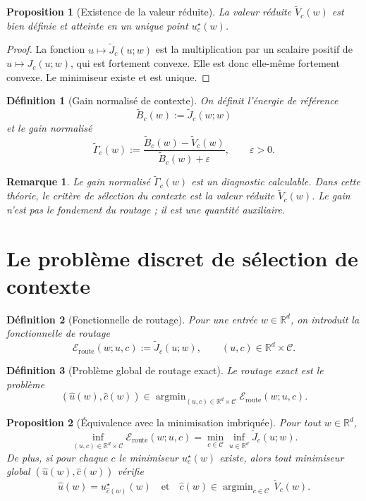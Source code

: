 \documentclass[11pt,a4paper]{article}
\newtheorem{definition}{Définition}[section]
\newtheorem{proposition}{Proposition}[section]
\newtheorem{remark}{Remarque}[section]
\DeclareMathOperator{\argmin}{argmin}
\newcommand{\R}{\mathbb R}
\newcommand{\Ccal}{\mathcal C}
\begin{document}
\begin{proposition}[Existence de la valeur réduite]
La valeur réduite \(\widetilde V_c(w)\) est bien définie et atteinte en un unique point \(u_c^\star(w)\).
\end{proposition}

\begin{proof}
La fonction \(u\mapsto \widetilde J_c(u;w)\) est la multiplication par un scalaire positif de \(u\mapsto J_c(u;w)\), qui est fortement convexe. Elle est donc elle-même fortement convexe. Le minimiseur existe et est unique.
\end{proof}

\begin{definition}[Gain normalisé de contexte]
On définit l'énergie de référence
\[
\widetilde B_c(w):=\widetilde J_c(w;w)
\]
et le gain normalisé
\[
\widetilde \Gamma_c(w)
:=
\frac{\widetilde B_c(w)-\widetilde V_c(w)}{\widetilde B_c(w)+\varepsilon},
\qquad \varepsilon>0.
\]
\end{definition}

\begin{remark}
Le gain normalisé \(\widetilde \Gamma_c(w)\) est un diagnostic calculable. Dans cette théorie, le critère de sélection du contexte est la valeur réduite \(\widetilde V_c(w)\). Le gain n'est pas le fondement du routage ; il est une quantité auxiliaire.
\end{remark}

\section{Le problème discret de sélection de contexte}

\begin{definition}[Fonctionnelle de routage]
Pour une entrée \(w\in\R^d\), on introduit la fonctionnelle de routage
\[
\mathcal E_{\mathrm{route}}(w;u,c):=\widetilde J_c(u;w),
\qquad
(u,c)\in \R^d\times\Ccal.
\]
\end{definition}

\begin{definition}[Problème global de routage exact]
Le routage exact est le problème
\[
(\hat u(w),\hat c(w))
\in
\argmin_{(u,c)\in \R^d\times\Ccal}\mathcal E_{\mathrm{route}}(w;u,c).
\]
\end{definition}

\begin{proposition}[Équivalence avec la minimisation imbriquée]
Pour tout \(w\in\R^d\),
\[
\inf_{(u,c)\in \R^d\times\Ccal}\mathcal E_{\mathrm{route}}(w;u,c)
=
\min_{c\in\Ccal}\inf_{u\in\R^d}\widetilde J_c(u;w).
\]
De plus, si pour chaque \(c\) le minimiseur \(u_c^\star(w)\) existe, alors tout minimiseur global \((\hat u(w),\hat c(w))\) vérifie
\[
\hat u(w)=u_{\hat c(w)}^\star(w)
\quad\text{et}\quad
\hat c(w)\in\argmin_{c\in\Ccal}\,\widetilde V_c(w).
\]
\end{proposition}
\end{document}
